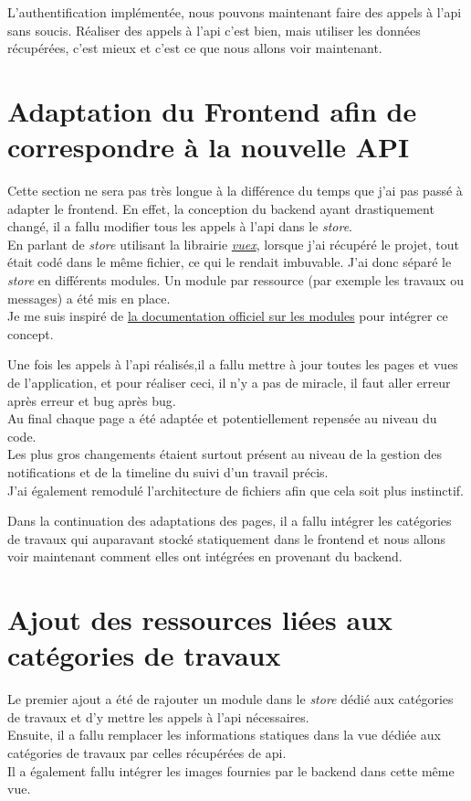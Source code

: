 \documentclass[
    iai, %
    il, %
]{heig-tb}
\begin{document}
L'authentification implémentée, nous pouvons maintenant faire des appels à l'\Gls{api} sans soucis. Réaliser des appels à l'\Gls{api} c'est bien, mais utiliser les données récupérées, c'est mieux et c'est ce que nous allons voir maintenant.

\section{Adaptation du Frontend afin de correspondre à la nouvelle API}
Cette section ne sera pas très longue à la différence du temps que j'ai pas passé à adapter le \Gls{frontend}. En effet, la conception du \Gls{backend} ayant drastiquement changé, il a fallu modifier tous les appels à l'\Gls{api} dans le \emph{store}. \\
En parlant de \emph{store} utilisant la librairie \href{https://vuex.vuejs.org/}{\emph{vuex}}, lorsque j'ai récupéré le projet, tout était codé dans le même fichier, ce qui le rendait imbuvable. J'ai donc séparé le \emph{store} en différents modules. Un module par ressource (par exemple les travaux ou messages) a été mis en place. \\
Je me suis inspiré de \href{https://vuex.vuejs.org/guide/modules.html}{la documentation officiel sur les modules} pour intégrer ce concept.

Une fois les appels à l'\Gls{api} réalisés,il a fallu mettre à jour toutes les pages et vues de l'application, et pour réaliser ceci, il n'y a pas de miracle, il faut aller erreur après erreur et bug après bug. \\
Au final chaque page a été adaptée et potentiellement repensée au niveau du code. \\
Les plus gros changements étaient surtout présent au niveau de la gestion des notifications et de la timeline du suivi d'un travail précis. \\
J'ai également remodulé l'architecture de fichiers afin que cela soit plus instinctif.

Dans la continuation des adaptations des pages, il a fallu intégrer les catégories de travaux qui auparavant stocké statiquement dans le \Gls{frontend} et nous allons voir maintenant comment elles ont intégrées en provenant du \Gls{backend}.

\section{Ajout des ressources liées aux catégories de travaux}
Le premier ajout a été de rajouter un module dans le \emph{store} dédié aux catégories de travaux et d'y mettre les appels à l'\Gls{api} nécessaires. \\
Ensuite, il a fallu remplacer les informations statiques dans la vue dédiée aux catégories de travaux par celles récupérées de \Gls{api}. \\
Il a également fallu intégrer les images fournies par le \Gls{backend} dans cette même vue.
\end{document}
